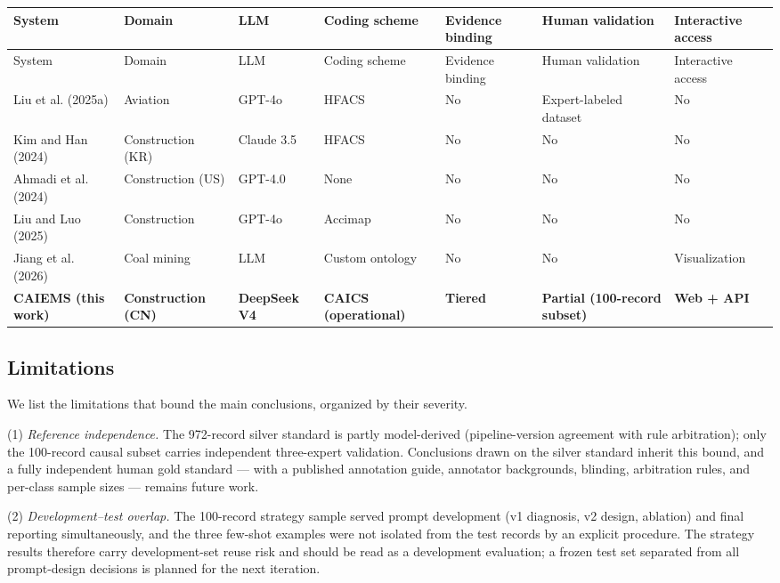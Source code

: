 \documentclass[11pt]{article}
\begin{document}
\begingroup\setlength{\tabcolsep}{2pt}\small
\begin{longtable}{>{\raggedright\arraybackslash}p{}>{\raggedright\arraybackslash}p{}>{\raggedright\arraybackslash}p{}>{\raggedright\arraybackslash}p{}>{\raggedright\arraybackslash}p{}>{\raggedright\arraybackslash}p{}>{\raggedright\arraybackslash}p{}}
\hline
System & Domain & LLM & Coding scheme & Evidence binding & Human validation & Interactive access \\
\hline\endfirsthead
\hline
System & Domain & LLM & Coding scheme & Evidence binding & Human validation & Interactive access \\
\hline\endhead
Liu et al. (2025a) & Aviation & GPT-4o & HFACS & No & Expert-labeled dataset & No \\
Kim and Han (2024) & Construction (KR) & Claude 3.5 & HFACS & No & No & No \\
Ahmadi et al. (2024) & Construction (US) & GPT-4.0 & None & No & No & No \\
Liu and Luo (2025) & Construction & GPT-4o & Accimap & No & No & No \\
Jiang et al. (2026) & Coal mining & LLM & Custom ontology & No & No & Visualization \\
\textbf{CAIEMS (this work)} & \textbf{Construction (CN)} & \textbf{DeepSeek V4} & \textbf{CAICS (operational)} & \textbf{Tiered} & \textbf{Partial (100-record subset)} & \textbf{Web + API} \\
\hline
\end{longtable}\endgroup
\subsection{Limitations}
We list the limitations that bound the main conclusions, organized by their severity.

(1) \textit{Reference independence.} The 972-record silver standard is partly model-derived (pipeline-version agreement with rule arbitration); only the 100-record causal subset carries independent three-expert validation. Conclusions drawn on the silver standard inherit this bound, and a fully independent human gold standard --- with a published annotation guide, annotator backgrounds, blinding, arbitration rules, and per-class sample sizes --- remains future work.

(2) \textit{Development--test overlap.} The 100-record strategy sample served prompt development (v1 diagnosis, v2 design, ablation) and final reporting simultaneously, and the three few-shot examples were not isolated from the test records by an explicit procedure. The strategy results therefore carry development-set reuse risk and should be read as a development evaluation; a frozen test set separated from all prompt-design decisions is planned for the next iteration.
\end{document}
